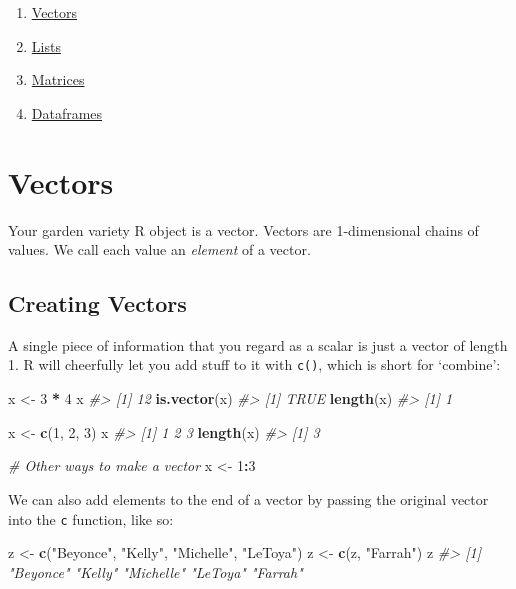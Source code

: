 \documentclass[]{book}
\newenvironment{Shaded}{\begin{snugshade}}{\end{snugshade}}
\newcommand{\KeywordTok}[1]{\textcolor[rgb]{0.13,0.29,0.53}{\textbf{#1}}}
\newcommand{\DecValTok}[1]{\textcolor[rgb]{0.00,0.00,0.81}{#1}}
\newcommand{\StringTok}[1]{\textcolor[rgb]{0.31,0.60,0.02}{#1}}
\newcommand{\CommentTok}[1]{\textcolor[rgb]{0.56,0.35,0.01}{\textit{#1}}}
\newcommand{\OperatorTok}[1]{\textcolor[rgb]{0.81,0.36,0.00}{\textbf{#1}}}
\newcommand{\NormalTok}[1]{#1}
\providecommand{\tightlist}{%
  \setlength{\itemsep}{0pt}\setlength{\parskip}{0pt}}
\begin{document}
\begin{enumerate}
\def\labelenumi{\arabic{enumi}.}
\tightlist
\item
  \protect\hyperlink{vectors}{Vectors}
\item
  \protect\hyperlink{lists}{Lists}
\item
  \protect\hyperlink{matrices}{Matrices}
\item
  \protect\hyperlink{dataframes}{Dataframes}
\end{enumerate}

\hypertarget{vectors}{\section{Vectors}\label{vectors}}

Your garden variety R object is a vector. Vectors are 1-dimensional
chains of values. We call each value an \emph{element} of a vector.

\subsection{Creating Vectors}\label{creating-vectors}

A single piece of information that you regard as a scalar is just a
vector of length 1. R will cheerfully let you add stuff to it with
\texttt{c()}, which is short for `combine':

\begin{Shaded}
\begin{Highlighting}[]
\NormalTok{x <-}\StringTok{ }\DecValTok{3} \OperatorTok{*}\StringTok{ }\DecValTok{4}
\NormalTok{x}
\CommentTok{#> [1] 12}
\KeywordTok{is.vector}\NormalTok{(x)}
\CommentTok{#> [1] TRUE}
\KeywordTok{length}\NormalTok{(x)}
\CommentTok{#> [1] 1}

\NormalTok{x <-}\StringTok{ }\KeywordTok{c}\NormalTok{(}\DecValTok{1}\NormalTok{, }\DecValTok{2}\NormalTok{, }\DecValTok{3}\NormalTok{)}
\NormalTok{x}
\CommentTok{#> [1] 1 2 3}
\KeywordTok{length}\NormalTok{(x)}
\CommentTok{#> [1] 3}

\CommentTok{# Other ways to make a vector}
\NormalTok{x <-}\StringTok{ }\DecValTok{1}\OperatorTok{:}\DecValTok{3}
\end{Highlighting}
\end{Shaded}

We can also add elements to the end of a vector by passing the original
vector into the \texttt{c} function, like so:

\begin{Shaded}
\begin{Highlighting}[]
\NormalTok{z <-}\StringTok{ }\KeywordTok{c}\NormalTok{(}\StringTok{"Beyonce"}\NormalTok{, }\StringTok{"Kelly"}\NormalTok{, }\StringTok{"Michelle"}\NormalTok{, }\StringTok{"LeToya"}\NormalTok{)}
\NormalTok{z <-}\StringTok{ }\KeywordTok{c}\NormalTok{(z, }\StringTok{"Farrah"}\NormalTok{)}
\NormalTok{z}
\CommentTok{#> [1] "Beyonce"  "Kelly"    "Michelle" "LeToya"   "Farrah"}
\end{Highlighting}
\end{Shaded}
\end{document}
